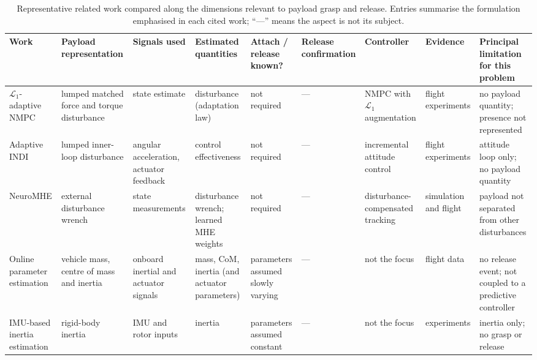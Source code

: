 \begin{spacing}{1.5}
\begin{table}
\centering
\caption[Representative related work compared]{Representative related work compared along the dimensions relevant to
payload grasp and release. Entries summarise the formulation emphasised in each
cited work; ``---'' means the aspect is not its subject.}
\label{tab:related}
\scriptsize
\setlength{\tabcolsep}{3pt}
\renewcommand{\arraystretch}{1.15}
\begin{tabularx}{\textheight}{@{}>{\raggedright\arraybackslash}p{0.10\textheight} >{\raggedright\arraybackslash}p{0.11\textheight} >{\raggedright\arraybackslash}p{0.10\textheight} >{\raggedright\arraybackslash}p{0.10\textheight} >{\raggedright\arraybackslash}p{0.08\textheight} >{\raggedright\arraybackslash}p{0.09\textheight} >{\raggedright\arraybackslash}p{0.09\textheight} >{\raggedright\arraybackslash}p{0.07\textheight} >{\raggedright\arraybackslash}X@{}}
\toprule
\textbf{Work} & \textbf{Payload representation} & \textbf{Signals used} &
\textbf{Estimated quantities} & \textbf{Attach / release known?} &
\textbf{Release confirmation} & \textbf{Controller} & \textbf{Evidence} &
\textbf{Principal limitation for this problem} \\
\midrule
$\mathcal{L}_1$-adaptive NMPC \cite{hanover2021} & lumped matched force and torque disturbance & state estimate & disturbance (adaptation law) & not required & --- & NMPC with $\mathcal{L}_1$ augmentation & flight experiments & no payload quantity; presence not represented \\
Adaptive INDI \cite{smeur} & lumped inner-loop disturbance & angular acceleration, actuator feedback & control effectiveness & not required & --- & incremental attitude control & flight experiments & attitude loop only; no payload quantity \\
NeuroMHE \cite{neuromhe} & external disturbance wrench & state measurements & disturbance wrench; learned MHE weights & not required & --- & disturbance-compensated tracking & simulation and flight & payload not separated from other disturbances \\
Online parameter estimation \cite{wuest2019,bohm2021} & vehicle mass, centre of mass and inertia & onboard inertial and actuator signals & mass, CoM, inertia (and actuator parameters) & parameters assumed slowly varying & --- & not the focus & flight data & no release event; not coupled to a predictive controller \\
IMU-based inertia estimation \cite{svacha2020} & rigid-body inertia & IMU and rotor inputs & inertia & parameters assumed constant & --- & not the focus & experiments & inertia only; no grasp or release \\

\end{tabularx}
\end{table}
\end{spacing}
